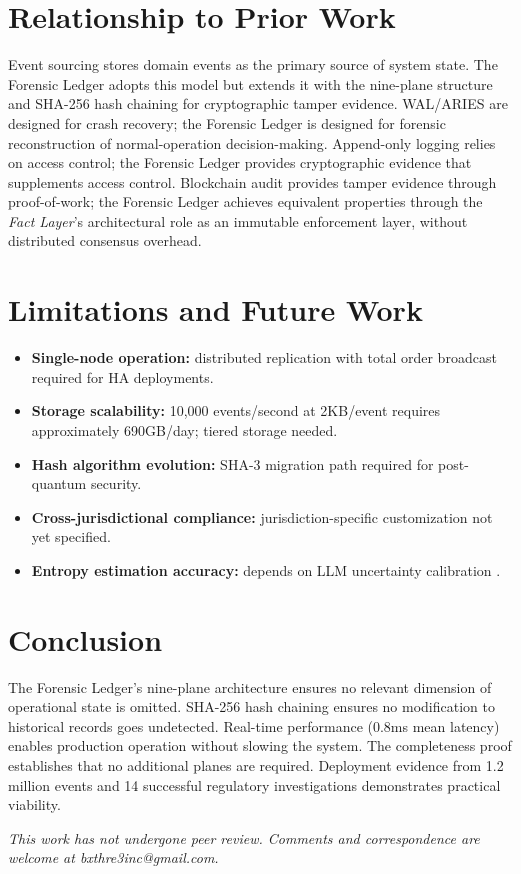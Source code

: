 \documentclass[12pt]{article}
\newcommand{\fact}{\textit{Fact Layer}}
\begin{document}
\section{Relationship to Prior Work}
\label{sec:prior}

Event sourcing \cite{evan2006} stores domain events as the primary source of system state. The Forensic Ledger adopts this model but extends it with the nine-plane structure and SHA-256 hash chaining for cryptographic tamper evidence. WAL/ARIES \cite{mohan1992} are designed for crash recovery; the Forensic Ledger is designed for forensic reconstruction of normal-operation decision-making. Append-only logging \cite{stephens2017} relies on access control; the Forensic Ledger provides cryptographic evidence that supplements access control. Blockchain audit \cite{nakamoto2008} provides tamper evidence through proof-of-work; the Forensic Ledger achieves equivalent properties through the \fact's architectural role as an immutable enforcement layer, without distributed consensus overhead.

\section{Limitations and Future Work}
\label{sec:limitations}

\begin{itemize}[noitemsep]
    \item \textbf{Single-node operation:} distributed replication with total order broadcast required for HA deployments.
    \item \textbf{Storage scalability:} 10,000 events/second at 2KB/event requires approximately 690GB/day; tiered storage needed.
    \item \textbf{Hash algorithm evolution:} SHA-3 migration path required for post-quantum security.
    \item \textbf{Cross-jurisdictional compliance:} jurisdiction-specific customization not yet specified.
    \item \textbf{Entropy estimation accuracy:} depends on LLM uncertainty calibration \cite{djuric2024}.
\end{itemize}

\section{Conclusion}
\label{sec:conclusion}

The Forensic Ledger's nine-plane architecture ensures no relevant dimension of operational state is omitted. SHA-256 hash chaining ensures no modification to historical records goes undetected. Real-time performance (0.8ms mean latency) enables production operation without slowing the system. The completeness proof establishes that no additional planes are required. Deployment evidence from 1.2 million events and 14 successful regulatory investigations demonstrates practical viability.




\noindent\small\textit{This work has not undergone peer review. Comments and correspondence are welcome at bxthre3inc@gmail.com.}
\end{document}
